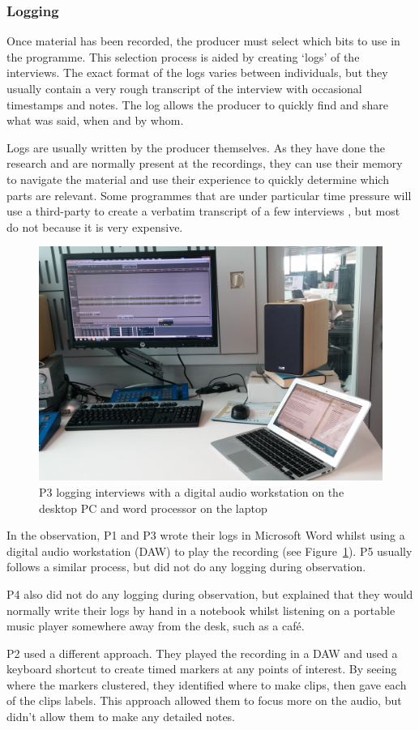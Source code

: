 \subsubsection{Logging}
Once material has been recorded, the producer must select which bits to use in
the programme.  This selection process is aided by creating `logs' of the
interviews. The exact format of the logs varies between individuals, but they
usually contain a very rough transcript of the interview with occasional
timestamps and notes.  The log allows the producer to quickly find and share
what was said, when and by whom.

Logs are usually written by the producer themselves. As they have done the
research and are normally present at the recordings, they can use their memory
to navigate the material and use their experience to quickly determine which
parts are relevant. Some programmes that are under particular time pressure
will use a third-party to create a verbatim transcript of a few interviews
\cite{Baume2015}, but most do not because it is very expensive.

\begin{figure}
\centering
  \includegraphics[width=0.5\columnwidth]{figs/phil-desk.jpg}
  \caption{P3 logging interviews with a digital audio workstation on the desktop
    PC and word processor on the laptop}
  \label{fig:desk}
\end{figure}

In the observation, P1 and P3 wrote their logs in Microsoft Word whilst using a
digital audio workstation (DAW) to play the recording (see
Figure~\ref{fig:desk}). P5 usually follows a similar process, but did not do
any logging during observation.

P4 also did not do any logging during observation, but explained that they
would normally write their logs by hand in a notebook whilst listening on a
portable music player somewhere away from the desk, such as a caf\'e.

P2 used a different approach. They played the recording in a DAW and used a
keyboard shortcut to create timed markers at any points of interest. By seeing
where the markers clustered, they identified where to make clips, then gave
each of the clips labels. This approach allowed them to focus more on the
audio, but didn't allow them to make any detailed notes.

